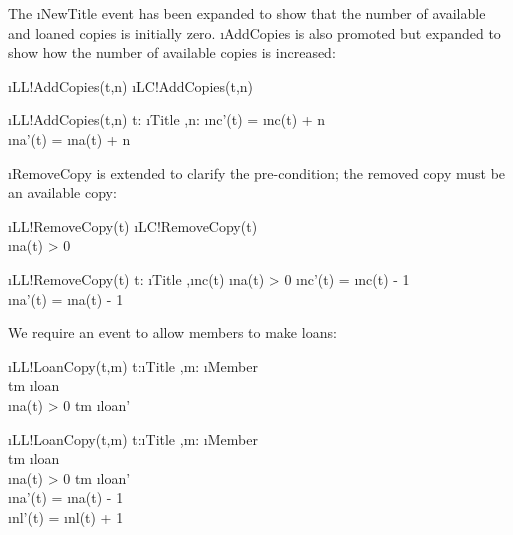 \documentclass[12pt,a4paper]{article}
\begin{document}
\medskip\noindent The \i{NewTitle} event has been expanded to show that the number of available and loaned copies is initially zero.
\i{AddCopies} is also promoted but expanded to show how the number of available copies is increased:
\begin{showspecs}
	\begin{spec}{\i{LL!AddCopies(t,n)}}	
		\i{LC!AddCopies(t,n)}
	\end{spec}
\showbeside
	\begin{spec}[\equiv]{\i{LL!AddCopies(t,n)}}	
		t: \i{Title} \sep n: 
	\post	
		\i{nc'}(t) = \i{nc}(t) + n\\
		\i{na'}(t) = \i{na}(t) + n
	\end{spec}
\end{showspecs}

\medskip\noindent \i{RemoveCopy} is extended to clarify the pre-condition; the removed copy must be an available copy:
\begin{showspecs}
	\begin{spec}{\i{LL!RemoveCopy(t)}}	
		\i{LC!RemoveCopy(t)}\\
		\i{na}(t) > 0
	\end{spec}
\showbeside
	\begin{spec}[\equiv]{\i{LL!RemoveCopy(t)}}	
		t: \i{Title} \sep \i{nc}(t) \geq \i{na}(t) > 0
	\post	
		\i{nc'}(t) = \i{nc}(t) - 1\\
		\i{na'}(t) = \i{na}(t) - 1
	\end{spec}
\end{showspecs}

\medskip\noindent
We require an event to allow members to make loans:
\begin{showspecs}
	\begin{spec}{\i{LL!LoanCopy(t,m)}}
		t:\i{Title} \sep m: \i{Member}\\
		t\mapsto m \notin \i{loan}\\
		\i{na}(t) > 0
	\post	t\mapsto m \in \i{loan'}
	\end{spec}
\showbeside
	\begin{spec}[\equiv]{\i{LL!LoanCopy(t,m)}}
		t:\i{Title} \sep m: \i{Member}\\
		t\mapsto m \notin \i{loan}\\
		\i{na}(t) > 0
	\post	t\mapsto m \in \i{loan'}\\
		\i{na'}(t) = \i{na}(t) - 1\\
		\i{nl'}(t) = \i{nl}(t) + 1
	\end{spec}
\end{showspecs}
\end{document}
